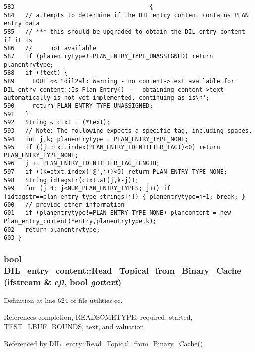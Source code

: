 \footnotesize\begin{verbatim}583                                      {
584   // attempts to determine if the DIL entry content contains PLAN entry data
585   // *** this should be upgraded to obtain the DIL entry content if it is
586   //     not available
587   if (planentrytype!=PLAN_ENTRY_TYPE_UNASSIGNED) return planentrytype;
588   if (!text) {
589     EOUT << "dil2al: Warning - no content->text available for DIL_entry_content::Is_Plan_Entry() --- obtaining content->text automatically is not yet implemented, continuing as is\n";
590     return PLAN_ENTRY_TYPE_UNASSIGNED;
591   }
592   String & ctxt = (*text);
593   // Note: The following expects a specific tag, including spaces.
594   int j,k; planentrytype = PLAN_ENTRY_TYPE_NONE;
595   if ((j=ctxt.index(PLAN_ENTRY_IDENTIFIER_TAG))<0) return PLAN_ENTRY_TYPE_NONE;
596   j += PLAN_ENTRY_IDENTIFIER_TAG_LENGTH;
597   if ((k=ctxt.index('@',j))<0) return PLAN_ENTRY_TYPE_NONE;
598   String idtagstr(ctxt.at(j,k-j));
599   for (j=0; j<NUM_PLAN_ENTRY_TYPES; j++) if (idtagstr==plan_entry_type_strings[j]) { planentrytype=j+1; break; }
600   // provide other information
601   if (planentrytype!=PLAN_ENTRY_TYPE_NONE) plancontent = new Plan_entry_content(*entry,planentrytype,k);
602   return planentrytype;
603 }
\end{verbatim}\normalsize 
{}
\subsubsection{\setlength{\rightskip}{0pt plus 5cm}bool DIL\_\-entry\_\-content::Read\_\-Topical\_\-from\_\-Binary\_\-Cache (ifstream \& {\em cfl}, bool {\em gottext})}\label{classDIL__entry__content_a5}




Definition at line 624 of file utilities.cc.

References completion, READSOMETYPE, required, started, TEST\_\-LBUF\_\-BOUNDS, text, and valuation.

Referenced by DIL\_\-entry::Read\_\-Topical\_\-from\_\-Binary\_\-Cache().




